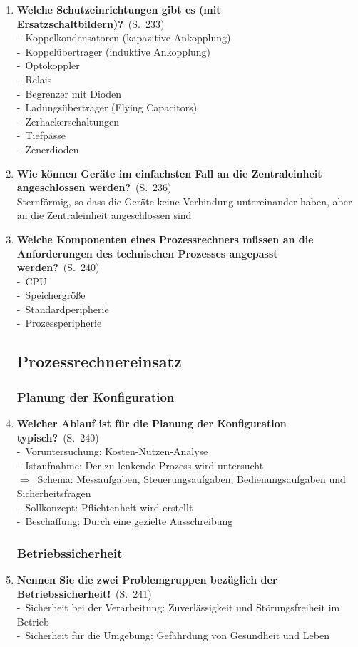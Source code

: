 \documentclass[a4paper,12pt]{article}
\newcommand{\question}[3]{\pagebreak[3]\item {\textbf{#1?}}\ (S.\ #2)#3}
\newcommand{\statement}[3]{\pagebreak[3]\item {\textbf{#1!}}\ (S.\ #2)#3}
\newcommand{\catchword}[1]{\\-\ #1}
\newcommand{\normaltext}[1]{\\#1}
\newcommand{\result}[1]{\\$\Rightarrow$\ #1}
\newcommand{\page}[1]{#1}
\begin{document}
\begin{enumerate}
  \question{Welche Schutzeinrichtungen gibt es (mit Ersatzschaltbildern)}{\page{233}}
  {
    \catchword{Koppelkondensatoren (kapazitive Ankopplung)}
    \catchword{Koppelübertrager (induktive Ankopplung)}
    \catchword{Optokoppler}
    \catchword{Relais}
    \catchword{Begrenzer mit Dioden}
    \catchword{Ladungsübertrager (Flying Capacitors)}
    \catchword{Zerhackerschaltungen}
    \catchword{Tiefpässe}
    \catchword{Zenerdioden}
  }

  \question{Wie können Geräte im einfachsten Fall an die Zentraleinheit angeschlossen
            werden}{\page{236}}
  {
    \normaltext{Sternförmig, so dass die Geräte keine Verbindung untereinander haben, aber
                an die Zentraleinheit angeschlossen sind}
  }

  \question{Welche Komponenten eines Prozessrechners müssen an die Anforderungen
            des technischen Prozesses angepasst werden}{\page{240}}
  {
    \catchword{CPU}
    \catchword{Speichergröße}
    \catchword{Standardperipherie}
    \catchword{Prozessperipherie}
  }

  \subsection{Prozessrechnereinsatz}

  \subsubsection{Planung der Konfiguration}

  \question{Welcher Ablauf ist für die Planung der Konfiguration typisch}{\page{240}}
  {
    \catchword{Voruntersuchung: Kosten-Nutzen-Analyse}
    \catchword{Istaufnahme: Der zu lenkende Prozess wird untersucht}
    \result{Schema: Messaufgaben, Steuerungsaufgaben, Bedienungsaufgaben und Sicherheitsfragen}
    \catchword{Sollkonzept: Pflichtenheft wird erstellt}
    \catchword{Beschaffung: Durch eine gezielte Ausschreibung}
  }

  \subsubsection{Betriebssicherheit}

  \statement{Nennen Sie die zwei Problemgruppen bezüglich der Betriebssicherheit}{\page{241}}
  {
    \catchword{Sicherheit bei der Verarbeitung: Zuverlässigkeit und Störungsfreiheit im Betrieb}
    \catchword{Sicherheit für die Umgebung: Gefährdung von Gesundheit und Leben}
  }


\end{enumerate}
\end{document}
